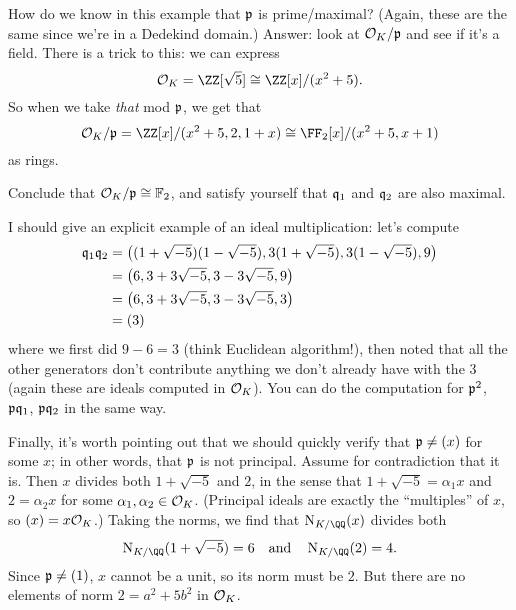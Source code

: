 How do we know in this example that $\mathfrak p$ is prime/maximal?
(Again, these are the same since we're in a Dedekind domain.)
Answer: look at $\mathcal O_K / \mathfrak p$ and see if it's a field.
There is a trick to this: we can express
\[ \OO_K = \ZZ[\sqrt5] \cong \ZZ[x] / (x^2+5). \]
So when we take \emph{that} mod $\mathfrak p$, we get that
\[ \OO_K / \pp = \ZZ[x] / (x^2+5, 2, 1+x) \cong \FF_2[x] / (x^2+5,x+1) \]
as rings.
\begin{ques}
	Conclude that $\mathcal O_K / \mathfrak p \cong \mathbb F_2$,
	and satisfy yourself that $\mathfrak q_1$ and $\mathfrak q_2$ are also maximal.
\end{ques}
I should give an explicit example of an ideal multiplication: let's compute
\begin{align*}
	\mathfrak q_1\mathfrak q_2 &= \left( (1+\sqrt{-5})(1-\sqrt{-5}), 3(1+\sqrt{-5}), 3(1-\sqrt{-5}), 9 \right) \\
	&= \left( 6, 3+3\sqrt{-5}, 3-3\sqrt{-5}, 9 \right) \\
	&= \left( 6, 3+3\sqrt{-5}, 3-3\sqrt{-5}, 3 \right) \\
	&= (3)
\end{align*}
where we first did $9-6=3$ (think Euclidean algorithm!),
then noted that all the other generators don't contribute
anything we don't already have with the $3$
(again these are ideals computed in $\mathcal O_K$).
You can do the computation for $\mathfrak p^2$, $\mathfrak p\mathfrak q_1$, $\mathfrak p\mathfrak q_2$ in the same way.

Finally, it's worth pointing out that we should quickly verify that $\mathfrak p \neq (x)$ for some $x$;
in other words, that $\mathfrak p$ is not principal.
Assume for contradiction that it is.
Then $x$ divides both $1+\sqrt{-5}$ and $2$, in the sense
that $1+\sqrt{-5} = \alpha_1 x$ and $2 = \alpha_2 x$
for some $\alpha_1, \alpha_2 \in \mathcal O_K$.
(Principal ideals are exactly the ``multiples'' of $x$, so $(x) = x \mathcal O_K$.)
Taking the norms, we find that $\Norm_{K/\QQ}(x)$ divides both 
\[ \Norm_{K/\QQ}(1+\sqrt{-5}) = 6 \quad\text{and}\quad \Norm_{K/\QQ}(2) = 4. \]
Since $\mathfrak p \neq (1)$, $x$ cannot be a unit, so its norm must be $2$.
But there are no elements of norm $2 = a^2+5b^2$ in $\mathcal O_K$.

